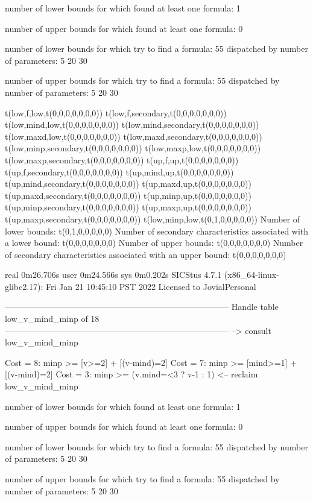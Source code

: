 number of lower bounds for which found at least one formula: 1

number of upper bounds for which found at least one formula: 0

number of lower bounds for which try to find a formula: 55
dispatched by number of parameters: 5  20  30

number of upper bounds for which try to find a formula: 55
dispatched by number of parameters: 5  20  30

t(low,f,low,t(0,0,0,0,0,0,0))
t(low,f,secondary,t(0,0,0,0,0,0,0))
t(low,mind,low,t(0,0,0,0,0,0,0))
t(low,mind,secondary,t(0,0,0,0,0,0,0))
t(low,maxd,low,t(0,0,0,0,0,0,0))
t(low,maxd,secondary,t(0,0,0,0,0,0,0))
t(low,minp,secondary,t(0,0,0,0,0,0,0))
t(low,maxp,low,t(0,0,0,0,0,0,0))
t(low,maxp,secondary,t(0,0,0,0,0,0,0))
t(up,f,up,t(0,0,0,0,0,0,0))
t(up,f,secondary,t(0,0,0,0,0,0,0))
t(up,mind,up,t(0,0,0,0,0,0,0))
t(up,mind,secondary,t(0,0,0,0,0,0,0))
t(up,maxd,up,t(0,0,0,0,0,0,0))
t(up,maxd,secondary,t(0,0,0,0,0,0,0))
t(up,minp,up,t(0,0,0,0,0,0,0))
t(up,minp,secondary,t(0,0,0,0,0,0,0))
t(up,maxp,up,t(0,0,0,0,0,0,0))
t(up,maxp,secondary,t(0,0,0,0,0,0,0))
t(low,minp,low,t(0,1,0,0,0,0,0))
Number of lower bounds:                                             t(0,1,0,0,0,0,0)
Number of secondary characteristics associated with a lower bound:  t(0,0,0,0,0,0,0)
Number of upper bounds:                                             t(0,0,0,0,0,0,0)
Number of secondary characteristics associated with an upper bound: t(0,0,0,0,0,0,0)

real	0m26.706s
user	0m24.566s
sys	0m0.202s
SICStus 4.7.1 (x86_64-linux-glibc2.17): Fri Jan 21 10:45:10 PST 2022
Licensed to JovialPersonal


--------------------------------------------------------------------------------
Handle table low_v_mind_minp of 18
--------------------------------------------------------------------------------
--> consult low_v_mind_minp

Cost =  8:  minp >= [v>=2] + [(v-mind)=2]
Cost =  7:  minp >= [mind>=1] + [(v-mind)=2]
Cost =  3:  minp >= (v.mind=<3 ? v-1 : 1)
<-- reclaim low_v_mind_minp

number of lower bounds for which found at least one formula: 1

number of upper bounds for which found at least one formula: 0

number of lower bounds for which try to find a formula: 55
dispatched by number of parameters: 5  20  30

number of upper bounds for which try to find a formula: 55
dispatched by number of parameters: 5  20  30

